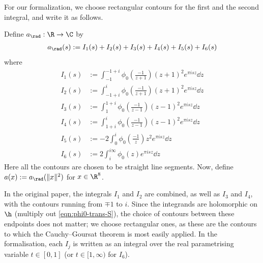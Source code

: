 For our formalization, we choose rectangular contours for the first and the second integral, and write it as follows.
\begin{definition}\label{def:a-definition}\leanok
{}
Define $a_{\rad} : \R \to \C$ by
\begin{align}\label{eqn:a-rad-definition}
    a_\rad(s) := I_1(s) + I_2(s) + I_3(s) + I_4(s) + I_5(s) + I_6(s)
\end{align}
where
\begin{align}
    I_1(s) &:= \int_{-1}^{-1 + i} \phi_0 \left(\frac{-1}{z+1}\right) (z + 1)^2 e^{\pi i s z} \dd z \label{eqn:a-I1} \\
    I_2(s) &:= \int_{-1 + i}^{i} \phi_0 \left(\frac{-1}{z+1}\right) (z + 1)^2 e^{\pi i s z} \dd z \label{eqn:a-I2} \\
    I_3(s) &:= \int_{1}^{1 + i} \phi_0 \left(\frac{-1}{z-1}\right) (z - 1)^2 e^{\pi i s z} \dd z \label{eqn:a-I3} \\
    I_4(s) &:= \int_{1 + i}^{i} \phi_0 \left(\frac{-1}{z-1}\right) (z - 1)^2 e^{\pi i s z} \dd z \label{eqn:a-I4} \\
    I_5(s) &:= -2 \int_{0}^{i} \phi_0 \left(\frac{-1}{z}\right) z^2 e^{\pi i s z} \dd z \label{eqn:a-I5} \\
    I_6(s) &:= 2 \int_{i}^{i\infty} \phi_0(z) e^{\pi i s z} \dd z \label{eqn:a-I6}
\end{align}
Here all the contours are chosen to be straight line segments.
Now, define $a(x) := a_{\rad}(\|x\|^2)$ for $x \in \R^8$.
\end{definition}
In the original paper, the integrals $I_1$ and $I_2$ are combined, as well as $I_3$ and $I_4$, with the contours running from $\mp 1$ to $i$.
Since the integrands are holomorphic on $\h$ (multiply out \eqref{eqn:phi0-trans-S}), the choice of contours between these endpoints does not matter; we choose rectangular ones, as these are the contours to which the Cauchy--Goursat theorem is most easily applied.
In the formalisation, each $I_j$ is written as an integral over the real parametrising variable $t \in [0,1]$ (or $t \in [1, \infty)$ for $I_6$).

